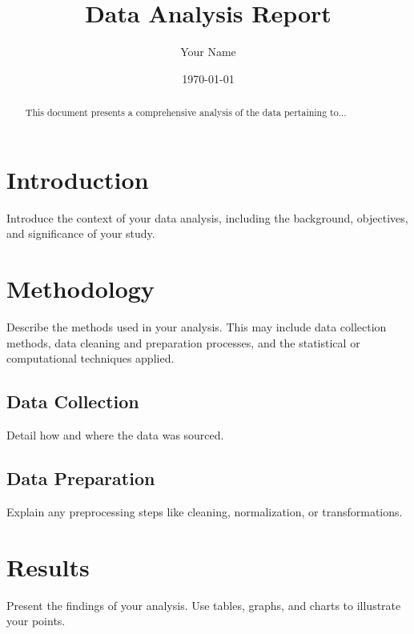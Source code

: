 \documentclass[11pt]{article}\usepackage[]{graphicx}\usepackage[]{xcolor}
\title{Data Analysis Report}
\author{Your Name}
\date{\today}
\begin{document}
\maketitle

\begin{abstract}
This document presents a comprehensive analysis of the data pertaining to...
\end{abstract}

\section{Introduction}
Introduce the context of your data analysis, including the background, objectives, and significance of your study.

\section{Methodology}
Describe the methods used in your analysis. This may include data collection methods, data cleaning and preparation processes, and the statistical or computational techniques applied.

\subsection{Data Collection}
Detail how and where the data was sourced.

\subsection{Data Preparation}
Explain any preprocessing steps like cleaning, normalization, or transformations.

\section{Results}
Present the findings of your analysis. Use tables, graphs, and charts to illustrate your points.
\end{document}
